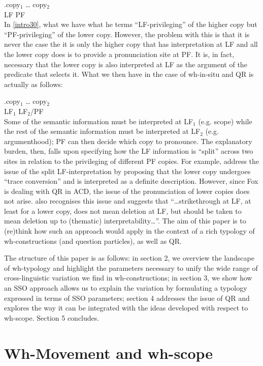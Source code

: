 \documentclass{glossa}
\begin{document}
\exg.\label{intro30}copy$_1$ {\dots} copy$_2$\\
   LF {} PF\\

In \ref{intro30}, what we have what he terms ``LF-privileging'' of the higher copy but ``PF-privileging'' of the lower copy. However, the problem with this is that it is never the case the it is only the higher copy that has interpretation at LF and all the lower copy does is to provide a pronunciation site at PF. It is, in fact, necessary that the lower copy is also interpreted at LF as the argument of the predicate that selects it. What we then have in the case of wh-in-situ and QR is actually as follows:

\exg.\label{intro40}copy$_1$ {\dots} copy$_2$\\
   LF$_1$ {} LF$_2$/PF\\

Some of the semantic information must be interpreted at LF$_1$ (e.g. scope) while the rest of the semantic information must be interpreted at LF$_2$ (e.g. argumenthood); PF can then decide which copy to pronounce. The explanatory burden, then, falls upon specifying how the LF information is ``split'' across two sites in relation to the privileging of different PF copies. For example, \cite{fox:2002} address the issue of the split LF-interpretation by proposing that the lower copy undergoes ``trace conversion'' and is interpreted as a definite description. However, since Fox is dealing with QR in ACD, the issue of the pronunciation of lower copies does not arise. \cite{bobaljik:2002} also recognises this issue and suggests that ``\dots strikethrough at LF, at least for a lower copy, does not mean deletion at LF, but should be taken to mean deletion up to (thematic) interpretability\dots ''. The aim of this paper is to (re)think how such an approach would apply in the context of a rich typology of wh-constructions (and question particles), as well as QR.

The structure of this paper is as follows: in section 2, we overview the landscape of wh-typology and highlight the parameters necessary to unify the wide range of cross-linguistic variation we find in wh-constructions; in section 3, we show how an SSO approach allows us to explain the variation by formulating a typology expressed in terms of SSO parameters; section 4 addresses the issue of QR and explores the way it can be integrated with the ideas developed with respect to wh-scope. Section 5 concludes.


\section{Wh-Movement and wh-scope}
\end{document}
